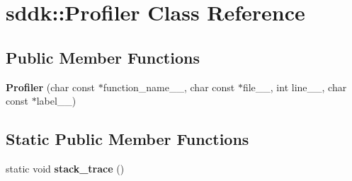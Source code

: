 \hypertarget{classsddk_1_1_profiler}{}\section{sddk\+:\+:Profiler Class Reference}
\label{classsddk_1_1_profiler}
\subsection*{Public Member Functions}
\begin{DoxyCompactItemize}
\item 
\hypertarget{classsddk_1_1_profiler_a9644db83ff8787929e4c0874cdccd02a}{}{\bfseries Profiler} (char const $\ast$function\+\_\+name\+\_\+\+\_\+, char const $\ast$file\+\_\+\+\_\+, int line\+\_\+\+\_\+, char const $\ast$label\+\_\+\+\_\+)\label{classsddk_1_1_profiler_a9644db83ff8787929e4c0874cdccd02a}

\end{DoxyCompactItemize}
\subsection*{Static Public Member Functions}
\begin{DoxyCompactItemize}
\item 
\hypertarget{classsddk_1_1_profiler_a0f99ccc4a78a2d4d347c4bd55b3436fc}{}static void {\bfseries stack\+\_\+trace} ()\label{classsddk_1_1_profiler_a0f99ccc4a78a2d4d347c4bd55b3436fc}

\end{DoxyCompactItemize}
